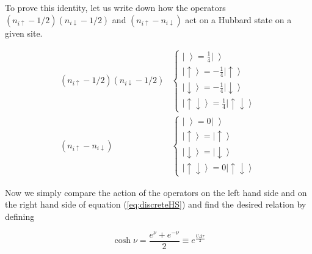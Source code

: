 \documentclass[10pt, twocolumn, twoside]{article}
\begin{document}
To prove this identity, let us write down how the operators  $(n_{i\uparrow} - 1/2 ) (n_{i\downarrow} - 1/2 )$ and $(n_{i\uparrow} - n_{i\downarrow} )$ act on a Hubbard state on a given site.

\begin{equation}
\begin{split}
(n_{i\uparrow} - 1/2 ) (n_{i\downarrow} - 1/2 )&
\begin{cases}
\left| \, \, \right\rangle = \frac{1}{4} \left| \, \, \right\rangle \\
\left| \uparrow \right\rangle = -\frac{1}{4} \left| \uparrow \right\rangle \\
\left| \downarrow \right\rangle = -\frac{1}{4} \left| \downarrow \right\rangle \\
\left| \uparrow \downarrow \right\rangle = \frac{1}{4} \left| \uparrow \downarrow \right\rangle
\end{cases}\\
(n_{i\uparrow} - n_{i\downarrow} )&
\begin{cases}
\left| \, \, \right\rangle = 0\left| \, \, \right\rangle \\
\left| \uparrow \right\rangle = \left| \uparrow \right\rangle \\
\left| \downarrow \right\rangle = \left| \downarrow \right\rangle \\
\left| \uparrow \downarrow \right\rangle = 0 \left| \uparrow \downarrow \right\rangle
\end{cases}
\end{split}
\end{equation}

Now we simply compare the action of the operators on the left hand side and on the right hand side of equation (\ref{eq:discreteHS}) and find the desired relation by defining

\begin{equation}
\cosh \nu =  \frac{e^\nu + e^{-\nu} }{2} \equiv e^{\frac{U\Delta \tau}{2}}
\end{equation}
\end{document}

